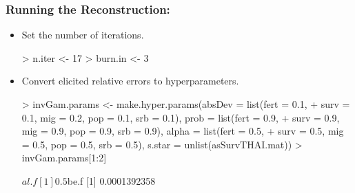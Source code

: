 \documentclass[smaller,compress,table]{beamer}
\begin{document}
\begin{frame}[fragile]
  \frametitle{Running the Reconstruction: }
  \begin{itemize}
  \item Set the number of iterations.
\begin{Schunk}
\begin{Sinput}
> n.iter <- 17
> burn.in <- 3
\end{Sinput}
\end{Schunk}

  \item Convert elicited relative errors to hyperparameters.

\begin{Schunk}
\begin{Sinput}
> invGam.params <- make.hyper.params(absDev = list(fert = 0.1, 
+     surv = 0.1, mig = 0.2, pop = 0.1, srb = 0.1), prob = list(fert = 0.9, 
+     surv = 0.9, mig = 0.9, pop = 0.9, srb = 0.9), alpha = list(fert = 0.5, 
+     surv = 0.5, mig = 0.5, pop = 0.5, srb = 0.5), s.star = unlist(asSurvTHAI.mat))
> invGam.params[1:2]
\end{Sinput}
\begin{Soutput}
$al.f
[1] 0.5

$be.f
[1] 0.0001392358
\end{Soutput}
\end{Schunk}

  \end{itemize}
\end{frame}
\end{document}
